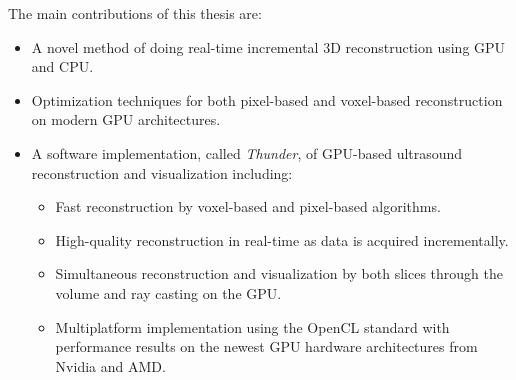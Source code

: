 The main contributions of this thesis are:

\begin{itemize}
	\item A novel method of doing real-time incremental 3D reconstruction using GPU and CPU.
	\item Optimization techniques for both pixel-based and voxel-based reconstruction on modern GPU architectures.
	\item A software implementation, called \emph{Thunder}, of GPU-based ultrasound reconstruction and visualization including:
	\begin{itemize}
		\item Fast reconstruction by voxel-based and pixel-based algorithms.
		\item High-quality reconstruction in real-time as data is acquired incrementally.
		\item Simultaneous reconstruction and visualization by both slices through the volume and ray casting on the GPU.
		\item Multiplatform implementation using the OpenCL standard with performance results on the newest GPU hardware architectures from Nvidia and AMD.
	\end{itemize}
\end{itemize}